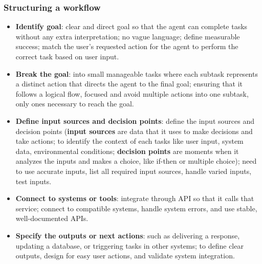 \documentclass[12pt, letterpaper]{article}
\begin{document}
\subsubsection{Structuring a workflow}
\begin{itemize}
    \item \textbf{Identify goal}: clear and direct goal so that the agent can complete tasks without any extra interpretation; no vague language; define measurable success; match the user's requested action for the agent to perform the correct task based on user input.
    \item \textbf{Break the goal}: into small manageable tasks where each subtask represents a distinct action that directs the agent to the final goal; ensuring that it follows a logical flow, focused and avoid multiple actions into one subtask, only ones necessary to reach the goal.
    \item \textbf{Define input sources and decision points}: define the input sources and decision points (\textbf{input sources} are data that it uses to make decisions and take actions; to identify the context of each tasks like user input, system data, environmental conditions; \textbf{decision points} are moments when it analyzes the inputs and makes a choice, like if-then or multiple choice); need to use accurate inputs, list all required input sources, handle varied inputs, test inputs.
    \item \textbf{Connect to systems or tools}: integrate through API so that it calls that service; connect to compatible systems, handle system errors, and use stable, well-documented APIs.
    \item \textbf{Specify the outputs or next actions}: such as delivering a response, updating a database, or triggering tasks in other systems; to define clear outputs, design for easy user actions, and validate system integration.
\end{itemize}
\end{document}
